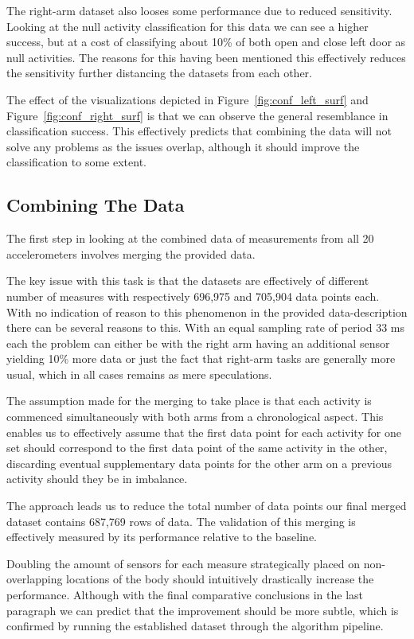 \documentclass{sig-alternate}
\begin{document}
The right-arm dataset also looses some performance due to reduced sensitivity. Looking at the null activity classification for this data we can see a higher success, but at a cost of classifying about 10\% of both open and close left door as null activities. The reasons for this having been mentioned this effectively reduces the sensitivity further distancing the datasets from each other.

The effect of the visualizations depicted in Figure~\ref{fig:conf_left_surf} and Figure~\ref{fig:conf_right_surf} is that we can observe the general resemblance in classification success. This effectively predicts that combining the data will not solve any problems as the issues overlap, although it should improve the classification to some extent.

\subsection{Combining The Data}
The first step in looking at the combined data of measurements from all 20 accelerometers involves merging the provided data.

The key issue with this task is that the datasets are effectively of different number of measures with respectively 696,975 and 705,904 data points each. With no indication of reason to this phenomenon in the provided data-description there can be several reasons to this. With an equal sampling rate of period 33 ms each the problem can either be with the right arm having an additional sensor yielding 10\% more data or just the fact that right-arm tasks are generally more usual, which in all cases remains as mere speculations.

The assumption made for the merging to take place is that each activity is commenced simultaneously with both arms from a chronological aspect. This enables us to effectively assume that the first data point for each activity for one set should correspond to the first data point of the same activity in the other, discarding eventual supplementary data points for the other arm on a previous activity should they be in imbalance.

The approach leads us to reduce the total number of data points our final merged dataset contains 687,769 rows of data. The validation of this merging is effectively measured by its performance relative to the baseline.

Doubling the amount of sensors for each measure strategically placed on non-overlapping locations of the body should intuitively drastically increase the performance. Although with the final comparative conclusions in the last paragraph we can predict that the improvement should be more subtle, which is confirmed by running the established dataset through the algorithm pipeline.
\end{document}
